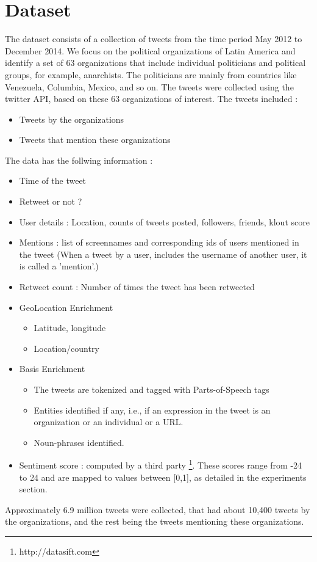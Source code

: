 

 \section{Dataset} 
 \label{sec:data}
 
 
The dataset consists of a collection of tweets from the time period May 2012 to December 2014. We focus on the political organizations of Latin America and identify a set of 63 organizations that include individual politicians and political groups, for example, anarchists. The politicians are mainly from countries like Venezuela, Columbia, Mexico, and so on. 
The tweets were collected using the twitter API, based on these 63 organizations of interest. The tweets included :
 \begin{itemize}
 \item Tweets by the organizations
 \item Tweets that mention these organizations
 \end{itemize}

The data has the follwing information :
\begin{itemize}
\item[1.] Time of the tweet
\item[2.] Retweet or not ?
\item[3.] User details : Location, counts of tweets posted, followers, friends, klout score
\item[4.] Mentions : list of screennames and corresponding ids of users mentioned in the tweet (When a tweet by a user, includes the username of another user, it is called a 'mention'.)
\item[5.] Retweet count : Number of times the tweet has been retweeted
\item[6.] GeoLocation Enrichment
\begin{itemize}
\item Latitude, longitude
\item Location/country
\end{itemize}
\item[7.] Basis Enrichment
\begin{itemize}
\item The tweets are tokenized and tagged with Parts-of-Speech tags
\item Entities identified if any, i.e., if an expression in the tweet is an organization  or an individual or a URL.
\item Noun-phrases identified.
\end{itemize}
\item[8.] Sentiment score : computed by a third party \footnote{http://datasift.com}. These scores range from -24 to 24 and are mapped to values between [0,1], as detailed in the experiments section.
\end{itemize}

Approximately 6.9 million tweets were collected, that had about 10,400 tweets by the organizations, and the rest being the tweets mentioning these organizations.
